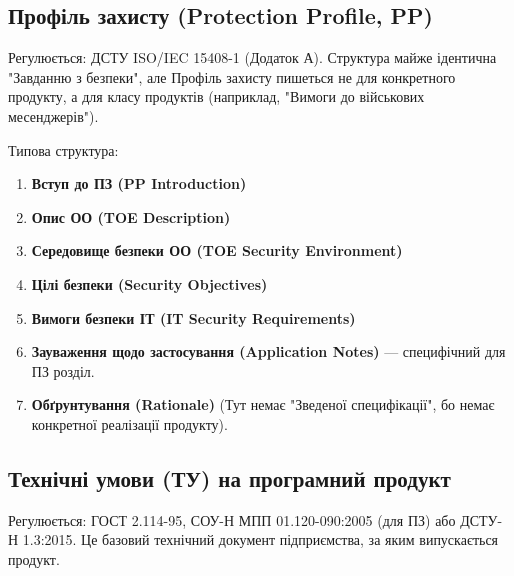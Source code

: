 \documentclass{article}
\begin{document}
\subsection{Профіль захисту (Protection Profile, PP)}

Регулюється: ДСТУ ISO/IEC 15408-1 (Додаток А). Структура майже ідентична "Завданню з безпеки",
але Профіль захисту пишеться не для конкретного продукту, а для класу продуктів (наприклад, "Вимоги до військових месенджерів").

Типова структура:
\begin{enumerate}
    \item \textbf{Вступ до ПЗ (PP Introduction)}
    \item \textbf{Опис ОО (TOE Description)}
    \item \textbf{Середовище безпеки ОО (TOE Security Environment)}
    \item \textbf{Цілі безпеки (Security Objectives)}
    \item \textbf{Вимоги безпеки ІТ (IT Security Requirements)}
    \item \textbf{Зауваження щодо застосування (Application Notes)} — специфічний для ПЗ розділ.
    \item \textbf{Обґрунтування (Rationale)} (Тут немає "Зведеної специфікації", бо немає конкретної реалізації продукту).
\end{enumerate}

\subsection{Технічні умови (ТУ) на програмний продукт}

Регулюється: ГОСТ 2.114-95, СОУ-Н МПП 01.120-090:2005 (для ПЗ) або ДСТУ-Н 1.3:2015. Це базовий технічний документ підприємства, за яким випускається продукт.
\end{document}
